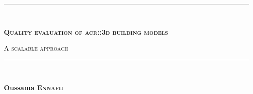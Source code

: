 \begin{titlepage}
    \begin{center}
        

        \vspace*{25mm}

        \rule{\textwidth}{1.5pt}\\
        \begin{LARGE}
            \textsc{\textbf{Quality evaluation of \texorpdfstring{\acrshort*{acr::3d}}{3D} building models}}\\
        \end{LARGE}
        \vspace*{2.5mm}
        \begin{Large}
            \textsc{A scalable approach}
        \end{Large}
        \rule{\textwidth}{1.5pt}\\

        \vspace*{15mm}

        \begin{large}
            \textbf{Oussama \textsc{Ennafii}}
        \end{large}

        \vfill

        

        \vfill


\end{center}
\end{titlepage}
